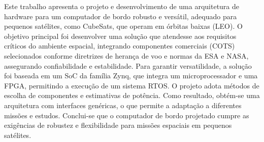 \documentclass[
12pt,				%
oneside,			%
a4paper,			%
chapter=TITLE,		%
section=TITLE,		%
english,			%
brazil				%
hyperref=hidelinks]{abntex2}
\begin{document}
\imprimircapa

\imprimirfolhaderosto

\begin{folhadeaprovacao}
\end{folhadeaprovacao}




\begin{resumo}
Este trabalho apresenta o projeto e desenvolvimento de uma arquitetura de hardware para um computador de bordo robusto e versátil, adequado para pequenos satélites, como CubeSats, que operam em órbitas baixas (LEO). O objetivo principal foi desenvolver uma solução que atendesse aos requisitos críticos do ambiente espacial, integrando componentes comerciais (COTS) selecionados conforme diretrizes de herança de voo e normas da ESA e NASA, assegurando confiabilidade e estabilidade. Para garantir versatilidade, a solução foi baseada em um SoC da família Zynq, que integra um microprocessador e uma FPGA, permitindo a execução de um sistema RTOS. O projeto adota métodos de escolha de componentes e estimativas de potência. Como resultado, obtém-se uma arquitetura com interfaces genéricas, o que permite a adaptação a diferentes missões e estudos. Conclui-se que o computador de bordo projetado cumpre as exigências de robustez e flexibilidade para missões espaciais em pequenos satélites.

\end{resumo}
\end{document}

